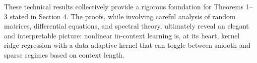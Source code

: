 	These technical results collectively provide a rigorous foundation for Theorems 1–3 stated in Section 4. The proofs, while involving careful analysis of random matrices, differential equations, and spectral theory, ultimately reveal an elegant and interpretable picture: nonlinear in-context learning is, at its heart, kernel ridge regression with a data-adaptive kernel that can toggle between smooth and sparse regimes based on context length.
	